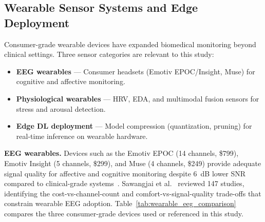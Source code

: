 \iffalse %
\subsection{Wearable Sensor Systems and Edge Deployment}

Consumer-grade wearable devices have expanded biomedical monitoring beyond clinical settings. Three sensor categories are relevant to this study:

\begin{itemize}[leftmargin=*, itemsep=2pt]
  \item \textbf{EEG wearables} --- Consumer headsets (Emotiv EPOC/Insight, Muse) for cognitive and affective monitoring.
  \item \textbf{Physiological wearables} --- HRV, EDA, and multimodal fusion sensors for stress and arousal detection.
  \item \textbf{Edge DL deployment} --- Model compression (quantization, pruning) for real-time inference on wearable hardware.
\end{itemize}

\textbf{EEG wearables.} Devices such as the Emotiv EPOC (14 channels, \$799), Emotiv Insight (5 channels, \$299), and Muse (4 channels, \$249) provide adequate signal quality for affective and cognitive monitoring despite 6~dB lower SNR compared to clinical-grade systems~\cite{duvinage2013emotiv, krigolson2017muse}. Sawangjai et al.~\cite{sawangjai2020consumer} reviewed 147 studies, identifying the cost-vs-channel-count and comfort-vs-signal-quality trade-offs that constrain wearable EEG adoption. Table~\ref{tab:wearable_eeg_comparison} compares the three consumer-grade devices used or referenced in this study.


